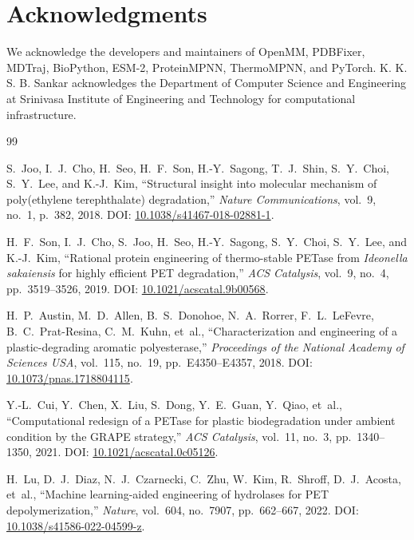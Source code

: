 \documentclass[11pt,a4paper]{article}
\begin{document}
\section{Acknowledgments}
We acknowledge the developers and maintainers of OpenMM, PDBFixer, MDTraj, BioPython, ESM-2, ProteinMPNN, ThermoMPNN, and PyTorch. K. K. S. B. Sankar acknowledges the Department of Computer Science and Engineering at Srinivasa Institute of Engineering and Technology for computational infrastructure.

\begin{thebibliography}{99}

S.~Joo, I.~J.~Cho, H.~Seo, H.~F.~Son, H.-Y.~Sagong, T.~J.~Shin, S.~Y.~Choi, S.~Y.~Lee, and K.-J.~Kim,
``Structural insight into molecular mechanism of poly(ethylene terephthalate) degradation,''
\textit{Nature Communications}, vol.~9, no.~1, p.~382, 2018.
\newblock DOI: \href{https://doi.org/10.1038/s41467-018-02881-1}{10.1038/s41467-018-02881-1}.

H.~F.~Son, I.~J.~Cho, S.~Joo, H.~Seo, H.-Y.~Sagong, S.~Y.~Choi, S.~Y.~Lee, and K.-J.~Kim,
``Rational protein engineering of thermo-stable PETase from \textit{Ideonella sakaiensis} for highly efficient PET degradation,''
\textit{ACS Catalysis}, vol.~9, no.~4, pp.~3519--3526, 2019.
\newblock DOI: \href{https://doi.org/10.1021/acscatal.9b00568}{10.1021/acscatal.9b00568}.

H.~P.~Austin, M.~D.~Allen, B.~S.~Donohoe, N.~A.~Rorrer, F.~L.~LeFevre, B.~C.~Prat-Resina, C.~M.~Kuhn, et~al.,
``Characterization and engineering of a plastic-degrading aromatic polyesterase,''
\textit{Proceedings of the National Academy of Sciences USA}, vol.~115, no.~19, pp.~E4350--E4357, 2018.
\newblock DOI: \href{https://doi.org/10.1073/pnas.1718804115}{10.1073/pnas.1718804115}.

Y.-L.~Cui, Y.~Chen, X.~Liu, S.~Dong, Y.~E.~Guan, Y.~Qiao, et~al.,
``Computational redesign of a PETase for plastic biodegradation under ambient condition by the GRAPE strategy,''
\textit{ACS Catalysis}, vol.~11, no.~3, pp.~1340--1350, 2021.
\newblock DOI: \href{https://doi.org/10.1021/acscatal.0c05126}{10.1021/acscatal.0c05126}.

H.~Lu, D.~J.~Diaz, N.~J.~Czarnecki, C.~Zhu, W.~Kim, R.~Shroff, D.~J.~Acosta, et~al.,
``Machine learning-aided engineering of hydrolases for PET depolymerization,''
\textit{Nature}, vol.~604, no.~7907, pp.~662--667, 2022.
\newblock DOI: \href{https://doi.org/10.1038/s41586-022-04599-z}{10.1038/s41586-022-04599-z}.


\end{thebibliography}
\end{document}
